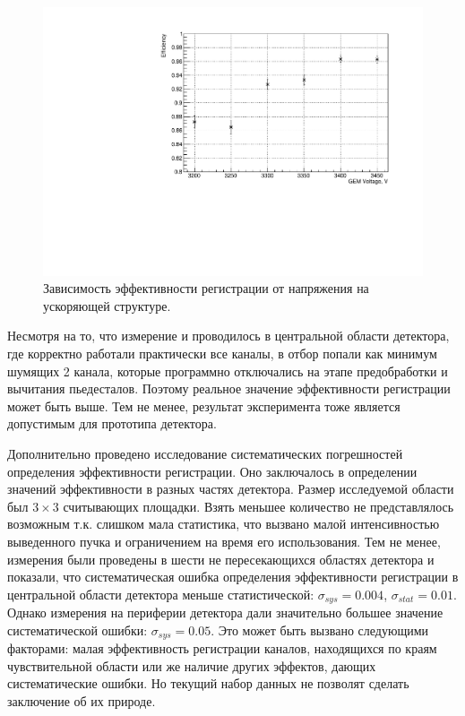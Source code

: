 \begin{figure}[h]
	\centering
	\includegraphics[width= 12cm]{img/eff_plot.pdf}
	\caption{Зависимость эффективности регистрации от напряжения на ускоряющей структуре.}
	\label{fig:eff_gr}
\end{figure}
Несмотря на то, что измерение и проводилось в центральной области детектора, где корректно работали практически все каналы, в отбор попали как минимум шумящих 2 канала, которые программно отключались на этапе предобработки и вычитания пьедесталов. Поэтому реальное значение эффективности регистрации может быть выше. Тем не менее, результат эксперимента тоже является допустимым для прототипа детектора.  
\par Дополнительно проведено исследование систематических погрешностей определения эффективности регистрации. Оно заключалось в определении значений эффективности в разных частях детектора. Размер исследуемой области был $3\times3$ считывающих площадки. Взять меньшее количество не представлялось возможным т.к. слишком мала статистика, что вызвано малой интенсивностью выведенного пучка и ограничением на время его использования. Тем не менее, измерения были проведены в шести не пересекающихся областях детектора и показали, что систематическая ошибка определения эффективности регистрации в центральной области детектора меньше статистической: $\sigma_{sys} = 0.004$, $\sigma_{stat} = 0.01$. Однако измерения на периферии детектора дали значительно большее значение систематической ошибки: $\sigma_{sys} = 0.05$. Это может быть вызвано следующими факторами: малая эффективность регистрации каналов, находящихся по краям чувствительной области или же наличие других эффектов, дающих систематические ошибки. Но текущий набор данных не позволят сделать заключение об их природе. 

